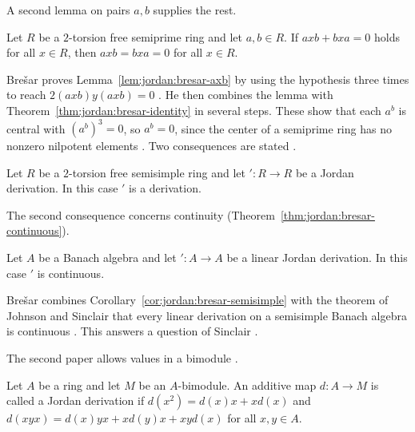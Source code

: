 A second lemma on pairs $a,b$ supplies the rest.

\begin{lemma}\label{lem:jordan:bresar-axb}
Let $R$ be a $2$-torsion free semiprime ring and let $a,b\in R$. If $axb+bxa=0$ holds
for all $x\in R$, then $axb=bxa=0$ for all $x\in R$.
\end{lemma}

Brešar proves Lemma~\ref{lem:jordan:bresar-axb} by using the hypothesis three times to
reach $2(axb)y(axb)=0$ \cite[p.~1004]{Bresar1988}. He then combines the lemma with
Theorem~\ref{thm:jordan:bresar-identity} in several steps. These show that each
$a^{b}$ is central with $(a^{b})^{3}=0$, so $a^{b}=0$, since the center of a semiprime
ring has no nonzero nilpotent elements \cite[p.~1005]{Bresar1988}. Two consequences are stated \cite[pp.~1005--1006]{Bresar1988}.

\begin{corollary}\label{cor:jordan:bresar-semisimple}
Let $R$ be a $2$-torsion free semisimple ring and let $'\colon R\to R$ be a Jordan
derivation. In this case $'$ is a derivation.
\end{corollary}

The second consequence concerns continuity (Theorem~\ref{thm:jordan:bresar-continuous}).

\begin{theorem}\label{thm:jordan:bresar-continuous}
Let $A$ be a Banach algebra and let $'\colon A\to A$ be a linear Jordan derivation.
In this case $'$ is continuous.
\end{theorem}

Brešar combines Corollary~\ref{cor:jordan:bresar-semisimple} with the theorem of
Johnson and Sinclair that every linear derivation on a semisimple Banach algebra is
continuous \cite[p.~1006]{Bresar1988}. This answers a question of Sinclair
\cite[p.~1006]{Bresar1988}.


The second paper allows values in a bimodule \cite[p.~411]{Bresar2005}.

\begin{definition}\label{def:jordan:bresar-2005}
Let $A$ be a ring and let $M$ be an $A$-bimodule. An additive map $d\colon A\to M$ is called a
Jordan derivation if $d(x^{2})=d(x)x+xd(x)$ and $d(xyx)=d(x)yx+xd(y)x+xyd(x)$ for all
$x,y\in A$.
\end{definition}

